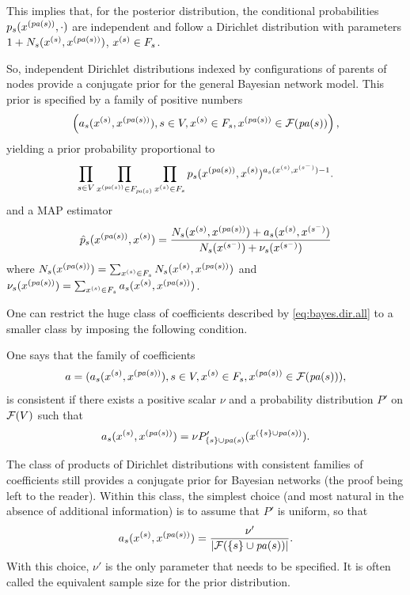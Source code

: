 This implies that, for the posterior distribution, the conditional
probabilities $p_s(x^{({\mathit{pa}(s)})}, \cdot)$ are independent and follow a Dirichlet
distribution with parameters $1+N_s(x^{(s)}, x^{({\mathit{pa}(s)})})$, $x^{(s)}\in F_s$. 

So, independent Dirichlet distributions indexed by configurations of
parents of nodes provide a conjugate prior for the general Bayesian network
model. This prior is specified by a family of positive numbers
\begin{equation}
\label{eq:bayes.dir.all}
\left(a_s(x^{(s)}, x^{({\mathit{pa}(s)})}), s\in V, x^{(s)}\in F_s, x^{({\mathit{pa}(s)})}\in {\mathcal F}({\mathit{pa}(s)})\right),
\end{equation}
yielding a prior probability proportional to 
$$
\prod_{s\in V} \prod_{x^{({\mathit{pa}(s)})}\in F_{{\mathit{pa}(s)}}} \prod_{x^{(s)}\in F_s} p_s(x^{({\mathit{pa}(s)})}, x^{(s)})^{a_s(x^{(s)}, x^{(s^{-})})-1}.
$$
and a MAP estimator
\begin{equation}
\label{eq:map.bn}
\hat p_s(x^{({\mathit{pa}(s)})}, x^{(s)}) = \frac{N_s(x^{(s)}, x^{({\mathit{pa}(s)})}) + a_s(x^{(s)},
x^{(s^{-})})}{N_s(x^{(s^{-})}) + \nu_s(x^{(s^{-})})}
\end{equation}
where $N_s(x^{({\mathit{pa}(s)})}) = \sum_{x^{(s)}\in F_s} N_s(x^{(s)}, x^{({\mathit{pa}(s)})})$ and
$\nu_s(x^{({\mathit{pa}(s)})}) = \sum_{x^{(s)}\in F_s} a_s(x^{(s)}, x^{({\mathit{pa}(s)})})$.

One can restrict the huge class of coefficients described by
\cref{eq:bayes.dir.all} to a smaller class by imposing the following
 condition. 
\begin{definition}
\label{def:a.consist}
One says that the family of coefficients
\[
a = (a_s(x^{(s)}, x^{({\mathit{pa}(s)})}), s\in V, x^{(s)}\in F_s, x^{({\mathit{pa}(s)})}\in {\mathcal F}({\mathit{pa}(s)})),
\]
is consistent if there exists a positive scalar $\nu$ and a probability
distribution $P'$ on ${\mathcal F}(V)$ such that
\[
a_s(x^{(s)}, x^{({\mathit{pa}(s)})})= \nu P'_{\{s\}\cup {\mathit{pa}(s)}}(x^{(\{s\}\cup {\mathit{pa}(s)})}).
\]
\end{definition}
The class of products of Dirichlet distributions with consistent families of coefficients still provides a
conjugate prior for Bayesian networks (the proof being left to the
reader). Within this class, the simplest choice (and most natural in the
absence of additional information) is to assume
that $P'$ is uniform, so that
\begin{equation}
\label{eq:prior}
a_s(x^{(s)}, x^{({\mathit{pa}(s)})}) = \frac{\nu'}{|{\mathcal F}(\{s\}\cup {\mathit{pa}(s)})|}.
\end{equation}
With this choice, $\nu'$ is the only parameter that needs to be
specified. It is often called the equivalent sample size for the prior
distribution.


